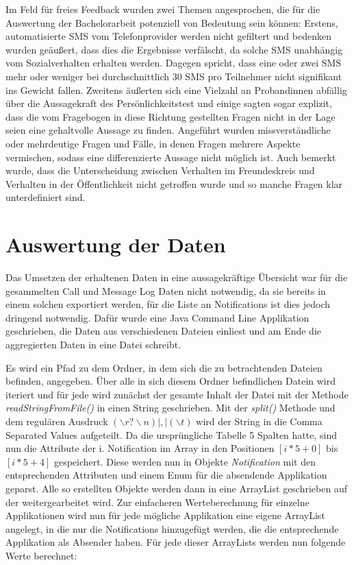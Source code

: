 Im Feld für freies Feedback wurden zwei Themen angesprochen, die für die Auswertung der Bachelorarbeit potenziell von Bedeutung sein können:
Erstens, automatisierte SMS vom Telefonprovider werden nicht gefiltert und bedenken wurden geäußert, dass dies die Ergebnisse verfälscht, da solche SMS unabhängig vom Sozialverhalten erhalten werden.
Dagegen spricht, dass eine oder zwei SMS mehr oder weniger bei durchschnittlich 30 SMS pro Teilnehmer nicht signifikant ins Gewicht fallen.
Zweitens äußerten sich eine Vielzahl an Probandinnen abfällig über die Aussagekraft des Persönlichkeitstest und einige sagten sogar explizit, dass die vom Fragebogen in diese Richtung gestellten Fragen nicht in der Lage seien eine gehaltvolle Aussage zu finden.
Angeführt wurden missverständliche oder mehrdeutige Fragen und Fälle, in denen Fragen mehrere Aspekte vermischen, sodass eine differenzierte Aussage nicht möglich ist. 
Auch bemerkt wurde, dass die Unterscheidung zwischen Verhalten im Freundeskreis und Verhalten in der Öffentlichkeit nicht getroffen wurde und so manche Fragen klar unterdefiniert sind.

\section{Auswertung der Daten}

Das Umsetzen der erhaltenen Daten in eine aussagekräftige Übersicht war für die gesammelten Call und Message Log Daten nicht notwendig, da sie bereits in einem solchen exportiert werden, für die Liste an Notifications ist dies jedoch dringend notwendig.
Dafür wurde eine Java Command Line Applikation geschrieben, die Daten aus verschiedenen Dateien einliest und am Ende die aggregierten Daten in eine Datei schreibt.
\par
Es wird ein Pfad zu dem Ordner, in dem sich die zu betrachtenden Dateien befinden, angegeben.
Über alle in sich diesem Ordner befindlichen Datein wird iteriert und für jede wird zunächst der gesamte Inhalt der Datei mit der Methode \emph{readStringFromFile()} in einen String geschrieben.
Mit der \emph{split()} Methode und dem regulären Ausdruck  $(\backslash r?\backslash n)|,|(\backslash t)$ wird der String in die Comma Separated Values aufgeteilt.
Da die ursprüngliche Tabelle 5 Spalten hatte, sind nun die Attribute der i. Notification im Array in den Positionen $ [i * 5 + 0]$ bis $ [i * 5 + 4]$ gespeichert.
Diese werden nun in Objekte \emph{Notification} mit den entsprechenden Attributen und einem Enum für die absendende Applikation geparst.
Alle so erstellten Objekte werden dann in eine ArrayList geschrieben auf der weitergearbeitet wird.
Zur einfacheren Werteberechnung für einzelne Applikationen wird nun für jede mögliche Applikation eine eigene ArrayList angelegt, in die nur die Notifications hinzugefügt werden, die die entsprechende Applikation als Absender haben.
Für jede dieser ArrayLists werden nun folgende Werte berechnet:

